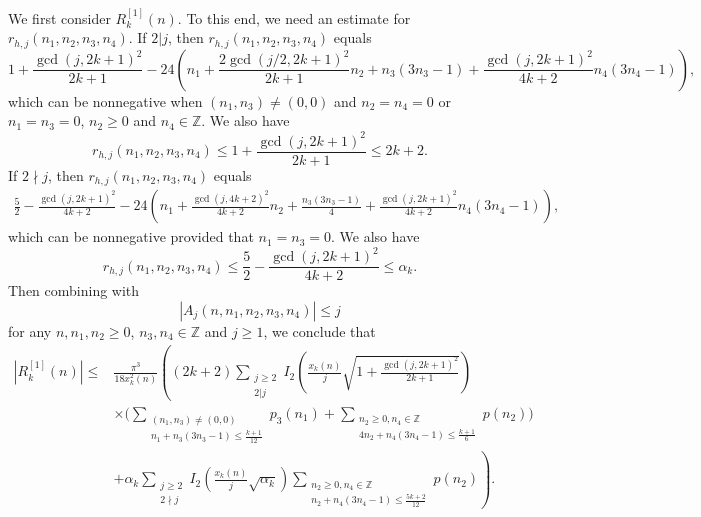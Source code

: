 \documentclass[12pt]{article}
\numberwithin{equation}{section}
\begin{document}
We first consider $R_{k}^{[1]}(n)$. To this end, we need an estimate for $r_{h,j}(n_1,n_2,n_3,n_4)$.
If $2|j$, then $r_{h,j}(n_1,n_2,n_3,n_4)$ equals
\begin{equation*}
1+\frac{\gcd(j,2k+1)^2}{2k+1}-24\left(n_1
+\frac{2\gcd(j/2,2k+1)^2}{2k+1}n_2+
n_3(3n_3-1)+\frac{\gcd(j,2k+1)^2}{4k+2}n_4(3n_4-1)\right),
\end{equation*}
which can be nonnegative when $(n_1,n_3)\neq (0,0)$ and $n_2=n_4=0$ or $n_1=n_3=0$, $n_2\geq 0$ and $n_4\in \mathbb{Z}$. We also have
\begin{equation*}
r_{h,j}(n_1,n_2,n_3,n_4)\leq1+\frac{\gcd(j,2k+1)^2}{2k+1}\leq 2k+2.
\end{equation*}
If $2\nmid j$, then $r_{h,j}(n_1,n_2,n_3,n_4)$ equals
\begin{align*}
\frac{5}{2}-\frac{\gcd(j,2k+1)^2}{4k+2}
-24\left(n_1+\frac{\gcd(j,4k+2)^2}{4k+2}n_2+
\frac{n_3(3n_3-1)}4+\frac{\gcd(j,2k+1)^2}{4k+2}n_4(3n_4-1)\right),
\end{align*}
which can be nonnegative provided that $n_1=n_3=0$. We also have
\begin{equation*}
r_{h,j}(n_1,n_2,n_3,n_4)\leq \frac{5}{2}-\frac{\gcd(j,2k+1)^2}{4k+2} \leq\alpha_k.
\end{equation*}
Then combining with
\begin{equation}\label{A-bound}
 |A_{j}(n,n_1,n_2,n_3,n_4)|\leq j
\end{equation}
for any $n,n_1,n_2\geq 0$, $n_3,n_4\in\mathbb{Z}$ and $j\geq 1$,
we conclude that
\begin{align*}
|R_{k}^{[1]}(n)|
\leq &\frac{\pi^3}{18 {x^2_{k}(n)}}\left(
\left(2k+2\right)\sum_{\substack{j\geq 2\\2|j}}
I_{2} \left( \frac{x_{k}(n)}{j}\sqrt{1+\frac{\gcd(j,2k+1)^2}{2k+1}} \right)
\right.
\\
&\times\Bigg(\sum_{\substack{(n_1,n_3)\neq(0,0) \\n_1+n_3(3n_3-1)\leq \frac{k+1}{12}}}p_3(n_1)+\sum_{\substack{n_2\geq 0,n_4\in \mathbb{Z} \\4n_2+n_4(3n_4-1)\leq \frac{k+1}{6}}}p(n_2)\Bigg)
\\
&\left.+\alpha_k\sum_{\substack{j\geq 2\\2\nmid j }}I_{2} \left( \frac{x_{k}(n)}{j} \sqrt{\alpha_k} \right)
\sum_{\substack{n_2\geq 0,n_4\in \mathbb{Z} \\n_2+n_4(3n_4-1)\leq \frac{5k+2}{12}}}p(n_2)
\right).
\end{align*}
\end{document}

